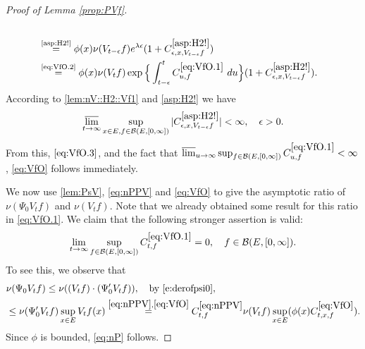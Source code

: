 \documentclass[12pt,a4paper]{amsart}
\numberwithin{equation}{section}
\theoremstyle{plain}
\theoremstyle{definition}
\theoremstyle{remark}
\begin{document}
\begin{proof}[Proof of Lemma \ref{prop:PVf}]
\begin{align}
	\\& \overset{\text{\eqref{asp:H2!}}}= \phi(x) \nu(V_{t-\epsilon}f) e^{\lambda  \epsilon} (1+C_{\epsilon,x, V_{t-\epsilon} f}^{\eqref{asp:H2!}} )
	\\& \label{eq:VfO.3}\overset{\text{\eqref{eq:VfO.2}}}= \phi(x)\nu(V_{t}f)\exp\Big\{ \int_{t-\epsilon}^t C^{\eqref{eq:VfO.1}}_{u,f} ~du\Big\} (1+C_{\epsilon,x, V_{t-\epsilon} f}^{\eqref{asp:H2!}} ).
\end{align}
	According to \eqref{lem:nV::H2::Vf1}  and \eqref{asp:H2!} we have
\begin{equation}	
	\varlimsup_{t\to \infty}\sup_{x\in E, f\in \mathcal B(E,[0,\infty])} 
	|C_{\epsilon,x, V_{t-\epsilon} f}^{\eqref{asp:H2!}}| < \infty, \quad \epsilon > 0.
\end{equation}
	From this, $\eqref{eq:VfO.3}$, and the fact that $\varlimsup_{u\to \infty} \sup_{f\in \mathcal B(E,[0,\infty])} C^{\eqref{eq:VfO.1}}_{u,f}  < \infty$, 
	\eqref{eq:VfO} follows immediately.
	
	We now use \eqref{lem:PsV}, \eqref{eq:nPPV} and \eqref{eq:VfO} to give the asymptotic ratio of $\nu(\Psi_0V_tf)$ and $\nu(V_tf)$.
	Note that we already obtained some result for this ratio in \eqref{eq:VfO.1}.
	We claim that the following stronger assertion is valid:
\begin{equation}\label{eq:nP}
	\lim_{t\to \infty}\sup_{f\in \mathcal B(E,[0,\infty])} C^{\eqref{eq:VfO.1}}_{t,f} = 0, 
	\quad f\in \mathcal B(E,[0,\infty]).
\end{equation}
	To see this, we observe that
\begin{align}
	&\nu(\Psi_0 V_tf)
	\leq \nu((V_tf)\cdot (\Psi_0' V_tf)) ,\quad\text{by \eqref{e:derofpsi0}},
	\\&  \leq  \nu(\Psi_0' V_tf) \sup_{x\in E}V_tf(x)
	\overset{\eqref{eq:nPPV},\eqref{eq:VfO}}=   C^{\eqref{eq:nPPV}}_{t,f} \nu(V_tf) \sup_{x\in E} (\phi(x) C^{\eqref{eq:VfO}}_{t,x,f}).
\end{align}
	Since $\phi$ is bounded, \eqref{eq:nP} follows.
	

\end{proof}
\end{document}
